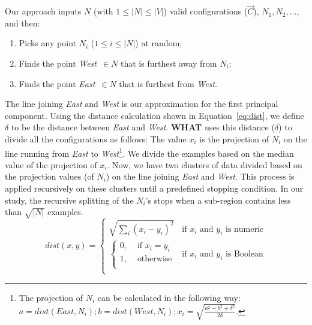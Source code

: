 \documentclass{newsig}
\newcommand{\what}{{\bf WHAT }}
\begin{document}
Our approach inputs $N$ (with $1\leq \left\vert{N}\right\vert\leq \left\vert{V}\right\vert$)
valid configurations ($\vec{C}$), $N_1,N_2,...$, and then:
\begin{enumerate}
\item
Picks any
point $N_i$ ($1\leq i \leq\left\vert{N}\right\vert$) at random;
\item
Finds
 the point  {\em West}~$\in N$ that is
furthest away from $N_i$;
\item Finds the point {\em East}~$\in N$
that is furthest from {\em West}.
\end{enumerate}
The line joining {\em East}
and {\em West} is our approximation for the first principal component.
Using the distance calculation shown in Equation~\ref{eq:dist}, 
we define $\delta$ to be the distance between {\em East}
and {\em West}. 
\what uses this distance ($\delta$) to divide all the configurations as follows:
The value $x_i$ is the projection of $N_i$
on the line  running  from {\em East} to {\em West}\footnote{The projection of $N_i$ can be calculated in the following way:\newline $a = \mathit{dist}(\mathit{East}, N_i); b = \mathit{dist}(\mathit{West}, N_i);  x_i = \sqrt{\frac{a^2 - b^2 + \delta^2}{2\delta}}$.
}.  We divide
the examples based on the median value of the projection of $x_i$. Now, we have two clusters of data divided based on the projection values (of $N_i$) on the line joining {\em East} and {\em West}. This process is applied recursively on these clusters until a predefined stopping condition. In our study, the  recursive splitting of the $N_i$'s stops when a sub-region
contains less than  $\sqrt{|N|}$ examples.
\begin{equation}
    \mathit{dist}(x, y) = 
    \begin{cases}
        \sqrt{\sum_i(x_i-y_i)^2}& \text{if $x_i$ and $y_i$ is numeric}\\
        \begin{cases}
            0, & \text{ if $x_i = y_i$}\\
            1, & \text{ otherwise}\\
        \end{cases}
        & \text{if $x_i$ and $y_i$ is Boolean}\\
    \end{cases}
    \label{eq:dist}
\end{equation}
\end{document}
